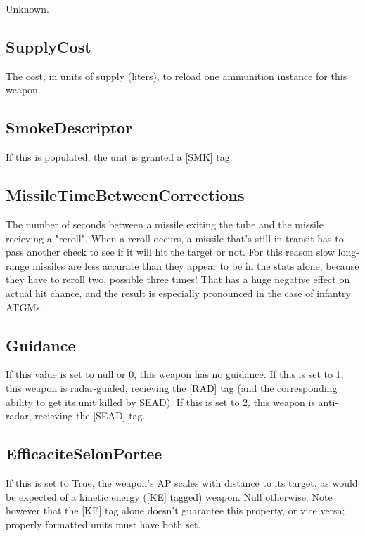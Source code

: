 \documentclass{article}
\begin{document}
Unknown.

\subsection{SupplyCost}

The cost, in units of supply (liters), to reload one ammunition instance for this weapon.

\subsection{SmokeDescriptor}

If this is populated, the unit is granted a [SMK] tag.

\subsection{MissileTimeBetweenCorrections}

The number of seconds between a missile exiting the tube and the missile recieving a "reroll". When a reroll occurs, a missile that's still in transit has to pass another check to see if it will hit the target or not. For this reason slow long-range missiles are less accurate than they appear to be in the stats alone, because they have to reroll two, possible three times! That has a huge negative effect on actual hit chance, and the result is especially pronounced in the case of infantry ATGMs.

\subsection{Guidance}

If this value is set to null or 0, this weapon has no guidance. If this is set to 1, this weapon is radar-guided, recieving the [RAD] tag (and the corresponding ability to get its unit killed by SEAD). If this is set to 2, this weapon is anti-radar, recieving the [SEAD] tag.

\subsection{EfficaciteSelonPortee}

If this is set to True, the weapon's AP scales with distance to its target, as would be expected of a kinetic energy ([KE] tagged) weapon. Null otherwise. Note however that the [KE] tag alone doesn't guarantee this property, or vice versa; properly formatted units must have both set.
\end{document}
